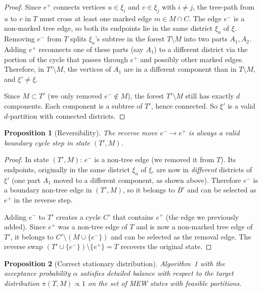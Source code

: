 \documentclass[11pt]{article}
\newtheorem{proposition}{Proposition}[section]
\begin{document}
\begin{proof}
Since $e^+$ connects vertices $u \in \xi_i$ and $v \in \xi_j$ with $i \neq j$, the
tree-path from $u$ to $v$ in $T$ must cross at least one marked edge
$m \in M \cap C$.
The edge $e^-$ is a non-marked tree edge, so both its endpoints lie in the same
district $\xi_a$ of $\xi$. Removing $e^-$ from $T$ splits $\xi_a$'s subtree in the
forest $T \setminus M$ into two parts $A_1, A_2$. Adding $e^+$ reconnects one
of these parts (say $A_1$) to a different district via the portion of the cycle
that passes through $e^+$ and possibly other marked edges. Therefore, in
$T' \setminus M$, the vertices of $A_1$ are in a different component than in
$T \setminus M$, and $\xi' \neq \xi$.

Since $M \subset T'$ (we only removed $e^- \notin M$), the forest
$T' \setminus M$ still has exactly $d$ components. Each component is a subtree
of $T'$, hence connected. So $\xi'$ is a valid $d$-partition with connected districts.
\end{proof}

\begin{proposition}[Reversibility]\label{prop:reversible}
The reverse move $e^- \to e^+$ is always a valid boundary cycle step in
state $(T', M)$.
\end{proposition}

\begin{proof}
In state $(T', M)$: $e^-$ is a non-tree edge (we removed it from $T$). Its
endpoints, originally in the same district $\xi_a$ of $\xi$, are now in
\emph{different} districts of $\xi'$ (one part $A_1$ moved to a different
component, as shown above). Therefore $e^-$ is a boundary non-tree edge in
$(T', M)$, so it belongs to $B'$ and can be selected as $e^+$ in the reverse step.

Adding $e^-$ to $T'$ creates a cycle $C'$ that contains $e^+$ (the edge we
previously added). Since $e^+$ was a non-tree edge of $T$ and is now a non-marked
tree edge of $T'$, it belongs to $C' \setminus (M \cup \{e^-\})$ and can be
selected as the removal edge. The reverse swap $(T' \cup \{e^-\}) \setminus \{e^+\} = T$ recovers the original state.
\end{proof}

\begin{proposition}[Correct stationary distribution]\label{prop:stationary}
Algorithm~1 with the acceptance probability $\alpha$ satisfies detailed balance
with respect to the target distribution $\pi(T, M) \propto 1$ on the set of
MEW states with feasible partitions.
\end{proposition}
\end{document}
